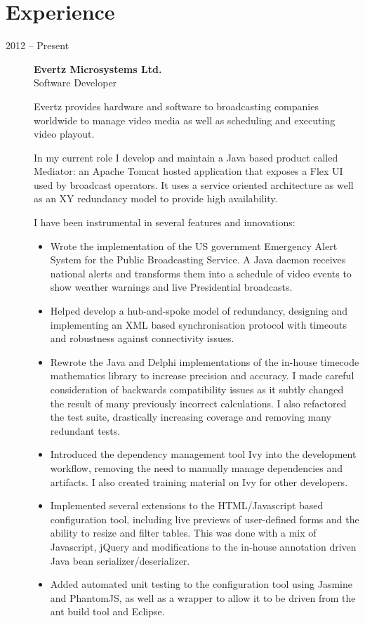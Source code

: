 \documentclass[10pt]{report}
\begin{document}
\section*{Experience}
\begin{description}
  \item[2012 -- Present]
    \textbf{Evertz Microsystems Ltd.} \\
    Software Developer

    Evertz provides hardware and software to broadcasting companies worldwide to manage video media as well as scheduling and executing video playout.

    In my current role I develop and maintain a Java based product called Mediator: an Apache Tomcat hosted application that exposes a Flex UI used by broadcast operators. It uses a service oriented architecture as well as an XY redundancy model to provide high availability.

    I have been instrumental in several features and innovations:

    \begin{itemize}
      \item Wrote the implementation of the US government Emergency Alert System for the Public Broadcasting Service. A Java daemon receives national alerts and transforms them into a schedule of video events to show weather warnings and live Presidential broadcasts.
      \item Helped develop a hub-and-spoke model of redundancy, designing and implementing an XML based synchronisation protocol with timeouts and robustness against connectivity issues.
      \item Rewrote the Java and Delphi implementations of the in-house timecode mathematics library to increase precision and accuracy. I made careful consideration of backwards compatibility issues as it subtly changed the result of many previously incorrect calculations. I also refactored the test suite, drastically increasing coverage and removing many redundant tests.
      \item Introduced the dependency management tool Ivy into the development workflow, removing the need to manually manage dependencies and artifacts. I also created training material on Ivy for other developers.
      \item Implemented several extensions to the HTML/Javascript based configuration tool, including live previews of user-defined forms and the ability to resize and filter tables. This was done with a mix of Javascript, jQuery and modifications to the in-house annotation driven Java bean serializer/deserializer.
      \item Added automated unit testing to the configuration tool using Jasmine and PhantomJS, as well as a wrapper to allow it to be driven from the ant build tool and Eclipse.
    \end{itemize}


\end{description}
\end{document}
